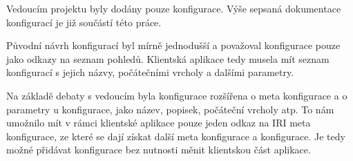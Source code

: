 \bigskip

Vedoucím projektu byly dodány pouze konfigurace. Výše sepsaná dokumentace konfigurací je již součástí této práce.

Původní návrh konfigurací byl mírně jednodušší a považoval konfigurace pouze jako odkazy na seznam pohledů. Klientská aplikace tedy musela mít seznam konfigurací s jejich názvy, počátečními vrcholy a dalšími parametry.

Na základě debaty s vedoucím byla konfigurace rozšířena o meta konfigurace a o parametry u konfigurace, jako název, popisek, počáteční vrcholy atp. To nám umožnilo mít v rámci klientské aplikace pouze jeden odkaz na IRI meta konfigurace, ze které se dají získat další meta konfigurace a konfigurace. Je tedy možné přidávat konfigurace bez nutnosti měnit klientskou část aplikace.

\bigskip

